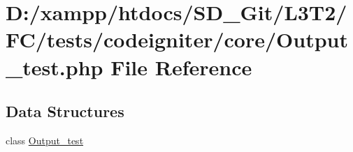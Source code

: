 \hypertarget{tests_2codeigniter_2core_2_output__test_8php}{}\section{D\+:/xampp/htdocs/\+S\+D\+\_\+\+Git/\+L3\+T2/\+F\+C/tests/codeigniter/core/\+Output\+\_\+test.php File Reference}
\label{tests_2codeigniter_2core_2_output__test_8php}
\subsection*{Data Structures}
\begin{DoxyCompactItemize}
\item 
class \hyperlink{class_output__test}{Output\+\_\+test}
\end{DoxyCompactItemize}
